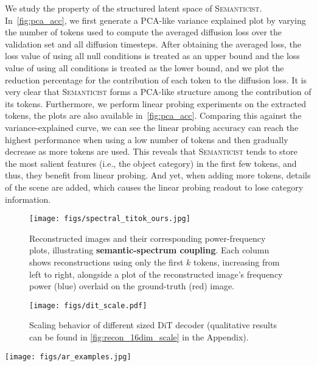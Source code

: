 \documentclass[10pt,twocolumn,letterpaper]{article}
\DeclareRobustCommand{\modelname}{\textsc{Semanticist}\xspace}
\DeclareRobustCommand{\armodelname}{$\epsilon$LlamaGen\xspace}
\begin{document}
We study the property of the structured latent space of \modelname.
In~\cref{fig:pca_acc}, we first generate a PCA-like variance explained plot by varying the number of tokens used to compute the averaged diffusion loss over the validation set and all diffusion timesteps.
After obtaining the averaged loss, the loss value of using all null conditions is treated as an upper bound and the loss value of using all conditions is treated as the lower bound, and we plot the reduction percentage for the contribution of each token to the diffusion loss.
It is very clear that \modelname forms a PCA-like structure among the contribution of its tokens.
Furthermore, we perform linear probing experiments on the extracted tokens, the plots are also available in~\cref{fig:pca_acc}.
Comparing this against the variance-explained curve, we can see the linear probing accuracy can reach the highest performance when using a low number of tokens and then gradually decrease as more tokens are used.
This reveals that \modelname tends to store the most salient features (i.e., the object category) in the first few tokens, and thus, they benefit from linear probing. 
And yet, when adding more tokens, details of the scene are added, which causes the linear probing readout to lose category information.

\begin{figure}
    \centering
    \texttt{[image: figs/spectral\_titok\_ours.jpg]}
    \vspace{-1em}
    \caption{Reconstructed images and their corresponding power-frequency plots, illustrating \textbf{semantic-spectrum coupling}. Each column shows reconstructions using only the first $k$ tokens, increasing from left to right, alongside a plot of the reconstructed image’s frequency power (blue) overlaid on the ground-truth (red) image.}
    \label{fig:ss_coupling}
\end{figure}


\begin{figure}
    \centering
    \texttt{[image: figs/dit\_scale.pdf]}
    \vspace{-.8em}
    \caption{Scaling behavior of different sized DiT decoder (qualitative results can be found in \cref{fig:recon_16dim_scale} in the Appendix).}
    \label{fig:dit_scale}
\end{figure}

\begin{figure*}[t]
    \centering
    \texttt{[image: figs/ar\_examples.jpg]}
    \caption{Examples of the intermediate generation results of \armodelname-L trained on \modelname tokens (see more from \cref{fig:more_example_ar}).}
    \label{fig:example_ar_results}
\end{figure*}
\end{document}
